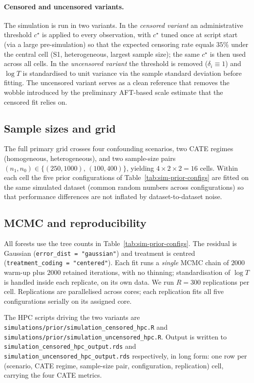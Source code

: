 \documentclass[11pt]{article}
\theoremstyle{plain}
\theoremstyle{definition}
\theoremstyle{remark}
\newcommand{\1}{\mathds{1}}
\begin{document}
\paragraph{Censored and uncensored variants.}
The simulation is run in two variants. In the \emph{censored variant} an
administrative threshold $c^\star$ is applied to every observation, with
$c^\star$ tuned once at script start (via a large pre-simulation) so that
the expected censoring rate equals $35\%$ under the central cell (S1,
heterogeneous, largest sample size); the same $c^\star$ is then used across
all cells. In the \emph{uncensored variant} the threshold is removed
($\delta_i \equiv 1$) and $\log T$ is standardised to unit variance via the
sample standard deviation before fitting. The uncensored variant serves as
a clean reference that removes the wobble introduced by the preliminary
AFT-based scale estimate that the censored fit relies on.

\subsection{Sample sizes and grid}
\label{sec:sim-prior-grid}

The full primary grid crosses four confounding scenarios, two CATE regimes
(homogeneous, heterogeneous), and two sample-size pairs
$(n_1, n_0) \in \{(250, 1000),\,(100, 400)\}$, yielding $4 \times 2 \times 2 = 16$
cells. Within each cell the five prior configurations of
Table~\ref{tab:sim-prior-configs} are fitted on the same simulated dataset
(common random numbers across configurations) so that performance
differences are not inflated by dataset-to-dataset noise.

\subsection{MCMC and reproducibility}
\label{sec:sim-prior-mcmc}

All forests use the tree counts in Table~\ref{tab:sim-prior-configs}. The
residual is Gaussian (\texttt{error\_dist = "gaussian"}) and treatment is
centred (\texttt{treatment\_coding = "centered"}). Each fit runs a
\emph{single} MCMC chain of $2000$ warm-up plus $2000$ retained
iterations, with no thinning; standardisation of $\log T$ is handled
inside each replicate, on its own data. We run $R = 300$ replications per
cell. Replications are parallelised across cores; each replication fits
all five configurations serially on its assigned core.

The HPC scripts driving the two variants are
\texttt{simulations/prior/simulation\_censored\_hpc.R} and
\texttt{simulations/prior/simulation\_uncensored\_hpc.R}. Output is written
to \texttt{simulation\_censored\_hpc\_output.rds} and
\texttt{simulation\_uncensored\_hpc\_output.rds} respectively, in long
form: one row per (scenario, CATE regime, sample-size pair, configuration,
replication) cell, carrying the four CATE metrics.
\end{document}
